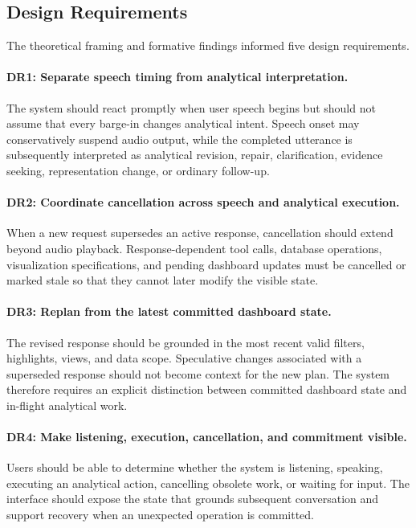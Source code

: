 \documentclass[journal]{IEEEtran}
\begin{document}
\subsection{Design Requirements}
\label{sec:design-requirements}

The theoretical framing and formative findings informed five design
requirements.

\paragraph{DR1: Separate speech timing from analytical interpretation.}

The system should react promptly when user speech begins but should not assume
that every barge-in changes analytical intent. Speech onset may conservatively
suspend audio output, while the completed utterance is subsequently
interpreted as analytical revision, repair, clarification, evidence seeking,
representation change, or ordinary follow-up.

\paragraph{DR2: Coordinate cancellation across speech and analytical execution.}

When a new request supersedes an active response, cancellation should extend
beyond audio playback. Response-dependent tool calls, database operations,
visualization specifications, and pending dashboard updates must be cancelled
or marked stale so that they cannot later modify the visible state.

\paragraph{DR3: Replan from the latest committed dashboard state.}

The revised response should be grounded in the most recent valid filters,
highlights, views, and data scope. Speculative changes associated with a
superseded response should not become context for the new plan. The system
therefore requires an explicit distinction between committed dashboard state
and in-flight analytical work.

\paragraph{DR4: Make listening, execution, cancellation, and commitment visible.}

Users should be able to determine whether the system is listening, speaking,
executing an analytical action, cancelling obsolete work, or waiting for
input. The interface should expose the state that grounds subsequent
conversation and support recovery when an unexpected operation is committed.
\end{document}
